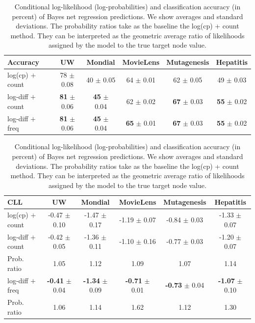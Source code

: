 \documentclass[runningheads,a4paper]{llncs}
\begin{document}
 
\begin{table}[thbp]
\caption{Conditional log-likelihood (log-probabilities) and classification accuracy (in percent) of Bayes net regression predictions. We show averages and standard deviations. The probability ratios take as the baseline the log(cp) + count method. They can be interpreted as the geometric average ratio of likelihoods assigned by the model to the true target node value.}


\begin{center}
\begin{tabular}{|l|c|c|c|c|c|}
\hline
Accuracy& UW & Mondial & MovieLens & Mutagenesis & Hepatitis \\\hline
log(cp) $+$ count & 78 $\pm$ 0.08 & 40 $\pm$ 0.05 & 64 $\pm$ 0.01 & 62 $\pm$ 0.05 & 49 $\pm$ 0.03 \\
log-diff $+$ count & \textbf{81} $\pm$ 0.06 & \textbf{45} $\pm$ 0.04 & 62 $\pm$ 0.02 & \textbf{67} $\pm$ 0.03 & \textbf{55} $\pm$ 0.02 \\
log-diff $+$ freq & \textbf{81} $\pm$ 0.06 & \textbf{45} $\pm$ 0.04 & \textbf{65} $\pm$ 0.01 & \textbf{67} $\pm$ 0.03 & \textbf{55} $\pm$ 0.02 \\
\hline
\end{tabular}
\end{center}

\begin{center}
\begin{tabular}{|l|c|c|c|c|c|}
\hline
CLL & UW & Mondial & MovieLens & Mutagenesis & Hepatitis \\\hline
log(cp) $+$ count & -0.47 $\pm$ 0.10 & -1.47 $\pm$ 0.17 & -1.19 $\pm$ 0.07 & -0.84 $\pm$ 0.03 & -1.33 $\pm$ 0.07 \\
log-diff $+$ count & -0.42 $\pm$ 0.05 & -1.36 $\pm$ 0.11 & -1.10 $\pm$ 0.16 & -0.77 $\pm$ 0.03 & -1.20 $\pm$ 0.07\\
Prob. ratio & 1.05 & 1.12 & 1.09 & 1.07 & 1.14\\\hline
log-diff $+$ freq & \textbf{-0.41} $\pm$ 0.04 & \textbf{-1.34} $\pm$ 0.09 & \textbf{-0.71} $\pm$ 0.01 & \textbf{-0.73} $\pm$ 0.04 & \textbf{-1.07} $\pm$ 0.10\\
Prob. ratio & 1.06 & 1.14 & 1.62 & 1.12 & 1.30\\
\hline
\end{tabular}
\end{center}
\label{table:bn}
\end{table}%
\end{document}
